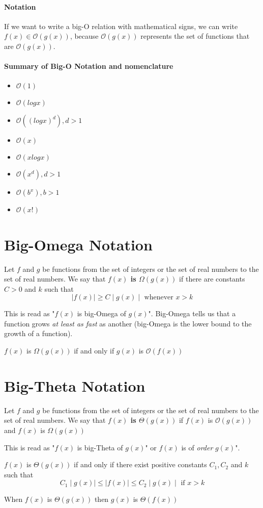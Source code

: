 \documentclass[10pt,a4paper]{book}
\begin{document}
\paragraph*{Notation}
If we want to write a big-O relation with mathematical signs, we can write $f(x) \in \mathcal{O}(g(x))$, because $\mathcal{O}(g(x))$ represents the set of functions that are $\mathcal{O}(g(x))$.
\paragraph*{Summary of Big-O Notation and nomenclature}
\begin{itemize}
	\item{ $\mathcal{O}(1)$}
    \item{ $\mathcal{O}(logx)$}
    \item{ $\mathcal{O}((logx)^d),d>1$}
    \item{ $\mathcal{O}(x)$}
    \item{ $\mathcal{O}(xlogx)$}
    \item{ $\mathcal{O}(x^d),d>1$}
    \item{ $\mathcal{O}(b^x),b>1$}
    \item{ $\mathcal{O}(x!)$}
\end{itemize}
\section{Big-Omega Notation}
Let $f$ and $g$ be functions from the set of integers or the set of real numbers to the set of real numbers. We say that \textbf{$f(x)$ is $\Omega (g(x))$} if there are constants $C > 0$ and $k$ such that \[\mid f(x)\mid \geq C\mid g(x)\mid\text{ whenever }x > k\]\par
This is read as "$f(x)$ is big-Omega of $g(x)$". Big-Omega tells us that a function grows \textit{at least as fast} as another (big-Omega is the lower bound to the growth of a function).\par 
$f(x)$ is $\Omega (g(x))$ if and only if $g(x)$ is $\mathcal{O}(f(x))$
\section{Big-Theta Notation}
Let $f$ and $g$ be functions from the set of integers or the set of real numbers to the set of real numbers. We say that \textbf{$f(x)$ is $\Theta (g(x))$} if $f(x)$ is $\mathcal{O}(g(x))$ and $f(x)$ is $\Omega (g(x))$\par
This is read as "$f(x)$ is big-Theta of $g(x)$" or $f(x)$ is of \textit{order} $g(x)$". \par 
$f(x)$ is $\Theta (g(x))$ if and only if there exist positive constants $C_1,C_2$ and $k$ such that \[C_1\mid g(x)\mid \leq \mid f(x)\mid \leq C_2\mid g(x)\mid \text{ if }x>k\]\par
When $f(x)$ is $\Theta (g(x))$ then $g(x)$ is $\Theta (f(x))$
\end{document}
